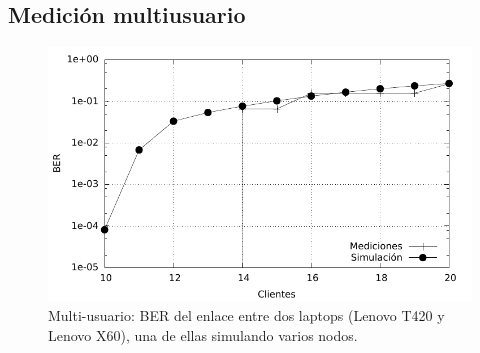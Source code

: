 \subsection{Medición multiusuario}
\begin{figure}[t]
  \centering
    \includegraphics[width=5in]{graphs/medidas_clientes_JIS-fig6.pdf}
\caption {Multi-usuario: BER del enlace entre dos laptops (Lenovo T420 y Lenovo X60), una de ellas simulando varios nodos.}
\label{fig:acumult}
\end{figure}

